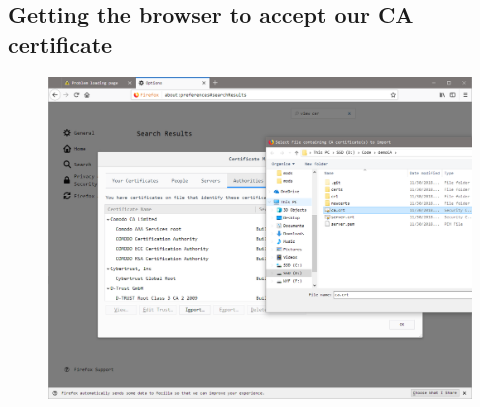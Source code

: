 \documentclass{article}
\begin{document}
\subsection{Getting the browser to accept our CA certificate}
\begin{figure}[H]\centering\includegraphics[width=\textwidth]{3-2.png}\end{figure}
\end{document}

